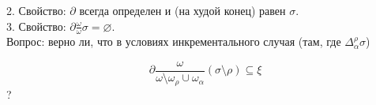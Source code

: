 2. Свойство: $\partial$ всегда определен и (на худой конец) равен $\sigma$.
\\

3. Свойство: $\partial\frac{\omega}{\omega}\sigma=\varnothing$.
\\

Вопрос: верно ли, что в условиях инкрементального случая (там, где $\Delta^\rho_\alpha\sigma$)

$$\partial\frac{\omega}{\omega\setminus\omega_\rho\cup\omega_\alpha}(\sigma\setminus\rho)\subseteq\xi$$ ? 

\newpage


